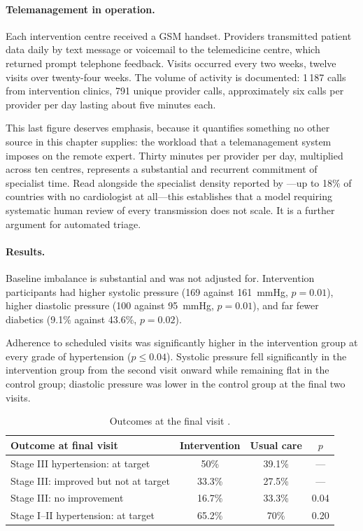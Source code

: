 \documentclass[12pt,a4paper,oneside]{report}
\begin{document}
\paragraph{Telemanagement in operation.} Each intervention centre received a GSM handset. Providers transmitted patient data daily by text message or voicemail to the telemedicine centre, which returned prompt telephone feedback. Visits occurred every two weeks, twelve visits over twenty-four weeks. The volume of activity is documented: 1\,187 calls from intervention clinics, 791 unique provider calls, approximately six calls per provider per day lasting about five minutes each.

This last figure deserves emphasis, because it quantifies something no other source in this chapter supplies: the workload that a telemanagement system imposes on the remote expert. Thirty minutes per provider per day, multiplied across ten centres, represents a substantial and recurrent commitment of specialist time. Read alongside the specialist density reported by \textcite{segun2025}---up to 18\% of countries with no cardiologist at all---this establishes that a model requiring systematic human review of every transmission does not scale. It is a further argument for automated triage.

\paragraph{Results.} Baseline imbalance is substantial and was not adjusted for. Intervention participants had higher systolic pressure (169 against 161~mmHg, $p=0.01$), higher diastolic pressure (100 against 95~mmHg, $p=0.01$), and far fewer diabetics (9.1\% against 43.6\%, $p=0.02$).

Adherence to scheduled visits was significantly higher in the intervention group at every grade of hypertension ($p \leq 0.04$). Systolic pressure fell significantly in the intervention group from the second visit onward while remaining flat in the control group; diastolic pressure was lower in the control group at the final two visits.

\begin{table}[htbp]
\centering\small
\caption{Outcomes at the final visit \parencite{kingue2013}.}\label{tab:telemedcam-results}
\begin{tabularx}{\textwidth}{@{}X c c c@{}}
\toprule
\textbf{Outcome at final visit} & \textbf{Intervention} & \textbf{Usual care} & \textbf{$p$} \\
\midrule
Stage III hypertension: at target & 50\% & 39.1\% & --- \\
Stage III: improved but not at target & 33.3\% & 27.5\% & --- \\
Stage III: no improvement & 16.7\% & 33.3\% & 0.04 \\
Stage I--II hypertension: at target & 65.2\% & 70\% & 0.20 \\
\bottomrule
\end{tabularx}
\end{table}
\end{document}
